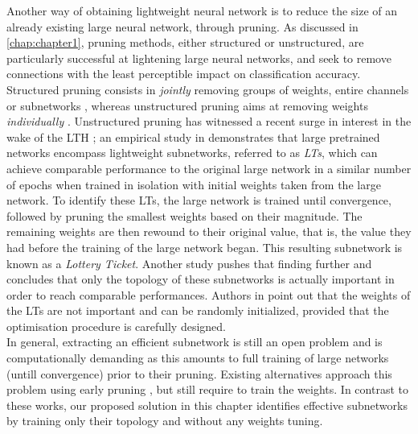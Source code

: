 Another way of obtaining lightweight neural network is to reduce the size of an
already existing large neural network, through pruning. As discussed in
\cref{chap:chapter1}, pruning methods, either structured or unstructured, are
particularly successful at lightening large neural networks, and seek to remove
connections with the least perceptible impact on classification accuracy.
Structured pruning consists in {\it jointly} removing groups of weights, entire
channels or subnetworks \cite{DBLP:conf/iclr/0022KDSG17,
DBLP:conf/iccv/LiuLSHYZ17}, whereas unstructured pruning aims at removing
weights {\it individually}
\cite{DBLP:conf/nips/HanPTD15,DBLP:journals/corr/HanMD15}.  Unstructured pruning
has witnessed a recent surge in interest in the wake of the \ac{LTH}
\cite{DBLP:conf/iclr/FrankleC19}; an empirical study in
\cite{DBLP:conf/iclr/FrankleC19} demonstrates that large pretrained networks
encompass lightweight subnetworks, referred to as \textit{\acp{LT}}, which can
achieve comparable performance to the original large network in a similar number
of epochs when trained in isolation with initial weights taken from the large
network. To identify these \acp{LT}, the large network is trained until
convergence, followed by pruning the smallest weights based on their magnitude.
The remaining weights are then rewound to their original value, that is, the
value they had before the training of the large network began. This resulting
subnetwork is known as a \textit{Lottery Ticket}. Another study
\cite{DBLP:conf/iclr/LiuSZHD19} pushes that finding further and concludes that
only the topology of these subnetworks is actually important in order to reach
comparable performances. Authors in \cite{DBLP:conf/iclr/LiuSZHD19} point out
that the weights of the \acp{LT} are not important and can be randomly
initialized, provided that the optimisation procedure is carefully designed.\\

In general, extracting an efficient subnetwork is
still an open problem and is computationally demanding as this amounts to full
training of large networks (untill convergence) prior to their pruning. Existing
alternatives approach this problem using early pruning
\cite{DBLP:conf/iclr/LeeAT19,
DBLP:conf/iclr/WangZG20,DBLP:conf/nips/TanakaKYG20}, but still require to train
the weights. In contrast to these works, our proposed solution in this chapter
identifies effective subnetworks by training only their topology and without any
weights tuning.\\ 

